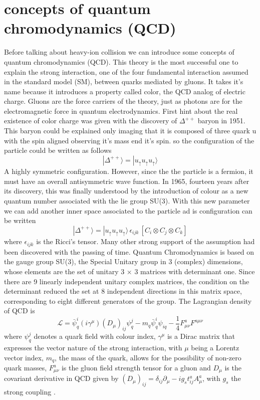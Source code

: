 \documentclass[12pt,a4paper]{book}
\begin{document}
	
	\chapter{concepts of quantum chromodynamics (QCD)}
	Before talking about heavy-ion collision we can introduce some concepts of quantum chromodynamics (QCD). This theory is the most successful one to explain the strong interaction, one of the four fundamental interaction assumed in the standard model (SM), between quarks mediated by gluons. It takes it's name because it introduces a property called color, the QCD analog of electric charge. Gluons are the force carriers of the theory, just as photons are for the electromagnetic force in quantum electrodynamics. 
	First hint about the real existence of color charge was given with the discovery of $\Delta^{++}$ baryon in 1951.  This baryon could be explained only imaging that it is composed of three quark u with the spin aligned observing it's mass end it's spin. so the configuration of the particle could be written as follows 
	\[
	|\Delta^{++}\rangle = | u_{\uparrow} u_{\uparrow} u_{\uparrow} \rangle
	\]
	A highly symmetric configuration. However, since the the particle is a fermion, it must have an overall antisymmetric wave function. In 1965, fourteen years after its discovery, this was finally understood by the introduction of colour as a new quantum number associated with the	lie group SU(3). With this new parameter we can add another inner space associated to the particle ad is configuration can be written
	\[
	|\Delta^{++}\rangle = | u_{\uparrow} u_{\uparrow} u_{\uparrow} \rangle \, \epsilon_{ijk} \, \left[ C_i \otimes C_j \otimes C_k \right]
	\]
	where $\epsilon_{ijk}$ is the Ricci's tensor. Many other strong support of the assumption had been discovered with the passing of time. Quantum Chromodynamics is based on the gauge group SU(3), the Special Unitary group in 3	(complex) dimensions, whose elements are the set of unitary 3 × 3 matrices with determinant one. Since there are 9 linearly independent unitary complex matrices, the condition on the determinant reduced the set at 8 independent directions in this matrix space, corresponding to eight different generators of the group.  The Lagrangian density of QCD is
	\begin{equation}
		\mathcal{L}= \bar{\psi}^i_q(i\gamma^\mu)(D_\mu)_{ij}\psi^j_q- m_q \bar{\psi}^i_q \psi_{iq}-\frac{1}{4} F^a_{\mu \nu} F^{a\mu \nu}
		\label{eq:QCD_lagrangian}
	\end{equation} 
	where $\psi^j_q$ denotes a quark field with colour index, $\gamma^\mu$ is a Dirac matrix that expresses the vector nature of the strong interaction, with $\mu$ being a Lorentz vector index, $m_q$, the mass of the quark, allows for the possibility of non-zero quark masses, $F^a_{\mu \nu}$ is the gluon field strength tensor for a gluon and $D_\mu$ is the covariant derivative in QCD given by $(D_\mu)_{ij}= \delta_{ij} \partial_\mu - ig_s t^a_{ij} A^a_\mu$, with $g_s$ the strong coupling \cite{Skands_2013}.
\end{document}
